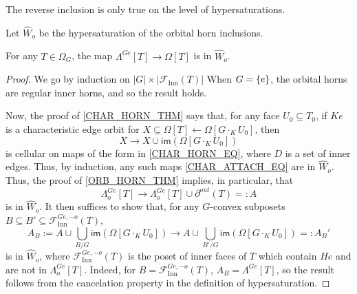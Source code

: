 \documentclass[a4paper,10pt,draft]{article}%
\numberwithin{equation}{section}%
\numberwithin{figure}{section}
\begin{document}
The reverse inclusion is only true on the level of hypersaturations.
\begin{definition}
      Let $\hat{W}_o$ be the hypersaturation of the orbital horn inclusions.
\end{definition}

\begin{proposition}
      \label{HORN_ORB_THM}
      For any $T \in \Omega_G$, the map
      $\Lambda^{G e}[T] \to \Omega[T]$
      is in $\hat{W}_o$.
\end{proposition}
\begin{proof}
      We go by induction on $|G| \times |\mathscr{F}_{\mathrm{Inn}}(T)|$ 
      When $G = \left\{e\right\}$, the orbital horns are regular inner horns, and so the result holds.

      Now, the proof of \cref{CHAR_HORN_THM} says that,
      for any face $U_0 \subseteq T_0$,
      if $K e$ is a characteristic edge orbit for $X \subseteq \Omega[T] \leftarrow \Omega[G \cdot_K U_0]$, then
      \begin{equation}
            \label{CHAR_ATTACH_EQ}
            X \to X \cup \mathsf{im}\left(\Omega[G \cdot_K U_0]\right)
      \end{equation}
      is cellular on maps of the form in \eqref{CHAR_HORN_EQ}, where $D$ is a set of inner edges.
      Thus, by induction, any such maps \eqref{CHAR_ATTACH_EQ} are in $\hat{W}_o$.
      Thus, the proof of \cref{ORB_HORN_THM} implies, in particular, that
      \begin{equation}
            \Lambda^{G e}_o[T] \to \Lambda^{G e}_o[T] \cup \partial^{out}(T) =: A
      \end{equation}
      is in $\hat{W}_o$.
      It then suffices to show that, for any $G$-convex subposets $B \subseteq B' \subseteq \mathscr{F}_{\mathrm{Inn}}^{G e,-o}(T)$,
      \begin{equation}
            \label{ORB_HORN_ATTACH_EQ}
            A_B := A \cup \mathop{\bigcup}\limits_{B/G}\mathsf{im}\left(\Omega[G \cdot_{K} U_0]\right)
            \to
            A \cup \mathop{\bigcup}\limits_{B'/G}\mathsf{im}\left(\Omega[G \cdot_{K} U_0]\right) =: A_B'
      \end{equation}
      is in $\hat{W}_o$,
      where $\mathscr{F}_{\mathrm{Inn}}^{G e,-o}(T)$ is the poset of inner faces of $T$ which contain $H e$ and are not in $\Lambda^{G e}_o[T]$.
      Indeed, for $B = \mathscr{F}_{\mathrm{Inn}}^{G e,-o}(T)$, $A_B = \Lambda^{G e}[T]$,
      so the result follows from the cancelation property in the definition of hypersaturation.


\end{proof}
\end{document}
